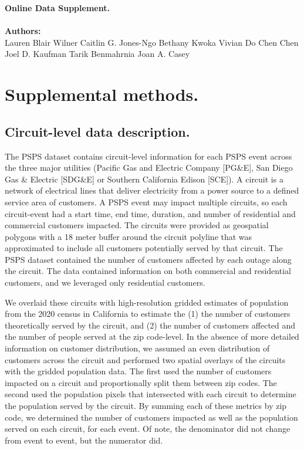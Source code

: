 \documentclass[../main.tex]{subfiles}
\begin{document}
\textbf{Online Data Supplement.}
\\
\\
\textbf{Authors:}
\\
Lauren Blair Wilner
Caitlin G. Jones-Ngo
Bethany Kwoka
Vivian Do
Chen Chen
Joel D. Kaufman
Tarik Benmahrnia
Joan A. Casey

\pagebreak


\section{Supplemental methods.}
\subsection{Circuit-level data description.}
The PSPS dataset contains circuit-level information for each PSPS event across the three major utilities (Pacific Gas and Electric Company [PG\&E], San Diego Gas \& Electric [SDG\&E] or Southern California Edison [SCE]). A circuit is a network of electrical lines that deliver electricity from a power source to a defined service area of customers. A PSPS event may impact multiple circuits, so each circuit-event had a start time, end time, duration, and number of residential and commercial customers impacted. The circuits were provided as geospatial polygons with a 18 meter buffer around the circuit polyline that was approximated to include all customers potentially served by that circuit. The PSPS dataset contained the number of customers affected by each outage along the circuit. The data contained information on both commercial and residential customers, and we leveraged only residential customers. 

We overlaid these circuits with high-resolution gridded estimates of population from the 2020 census in California to estimate the (1) the number of customers theoretically served by the circuit, and (2) the number of customers affected and the number of people served at the zip code-level. In the absence of more detailed information on customer distribution, we assumed an even distribution of customers across the circuit and performed two spatial overlays of the circuits with the gridded population data. The first used the number of customers impacted on a circuit and proportionally split them between zip codes. The second used the population pixels that intersected with each circuit to determine the population served by the circuit. By summing each of these metrics by zip code, we determined the number of customers impacted as well as the population served on each circuit, for each event. Of note, the denominator did not change from event to event, but the numerator did.
\end{document}
